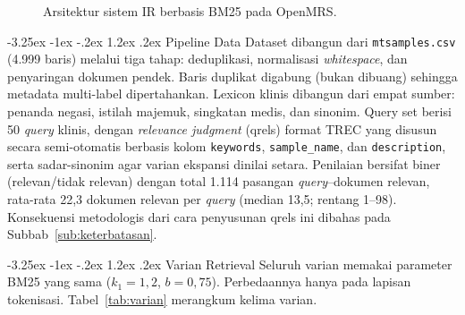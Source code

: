\documentclass[a4paper,12pt]{article}
\makeatletter
\renewcommand{\subsection}{\@startsection{subsection}{2}{\z@}%
  {-3.25ex \@plus -1ex \@minus -.2ex}%
  {1.2ex \@plus .2ex}%
  {\normalfont\normalsize\bfseries}}
\makeatother
\begin{document}
\begin{figure}[h]
  \centering
  \caption{Arsitektur sistem IR berbasis BM25 pada OpenMRS.}
  \label{fig:arsitektur}
\end{figure}

\subsection{Pipeline Data}
Dataset dibangun dari \texttt{mtsamples.csv} (4.999 baris) melalui tiga tahap: deduplikasi, normalisasi \textit{whitespace}, dan penyaringan dokumen pendek. Baris duplikat digabung (bukan dibuang) sehingga metadata multi-label dipertahankan. Lexicon klinis dibangun dari empat sumber: penanda negasi, istilah majemuk, singkatan medis, dan sinonim. Query set berisi 50 \textit{query} klinis, dengan \textit{relevance judgment} (qrels) format TREC yang disusun secara semi-otomatis berbasis kolom \texttt{keywords}, \texttt{sample\_name}, dan \texttt{description}, serta sadar-sinonim agar varian ekspansi dinilai setara. Penilaian bersifat biner (relevan/tidak relevan) dengan total 1.114 pasangan \textit{query}--dokumen relevan, rata-rata 22,3 dokumen relevan per \textit{query} (median 13,5; rentang 1--98). Konsekuensi metodologis dari cara penyusunan qrels ini dibahas pada Subbab~\ref{sub:keterbatasan}.

\subsection{Varian Retrieval}
Seluruh varian memakai parameter BM25 yang sama ($k_1 = 1{,}2$, $b = 0{,}75$). Perbedaannya hanya pada lapisan tokenisasi. Tabel~\ref{tab:varian} merangkum kelima varian.
\end{document}
